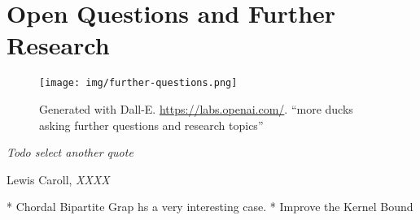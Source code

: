 \chapter{Open Questions and Further Research}

\vspace*{-50pt}

\begin{figure}[ht]
        \texttt{[image: img/further-questions.png]}
        \captionsetup{textformat=empty,labelformat=blank}
        \caption{Generated with Dall-E. \url{https://labs.openai.com/}. ``more ducks asking further questions and research topics''}
\end{figure}

\epigraph{\itshape Todo select another quote}{Lewis Caroll, \textit{XXXX}}

* Chordal Bipartite Grap hs a very interesting case.
* Improve the Kernel Bound
